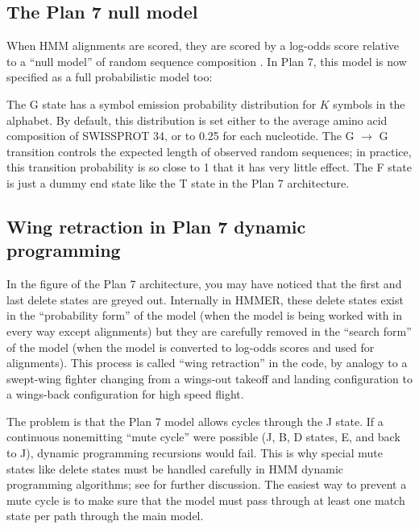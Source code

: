 \documentclass[11pt]{report}
\begin{document}
\subsection{The Plan 7 null model}

When HMM alignments are scored, they are scored by a log-odds score
relative to a ``null model'' of random sequence composition
\cite{Barrett97}. In Plan 7, this model is now specified as a full
probabilistic model too:

\begin{center}
\end{center}

The G state has a symbol emission probability distribution for $K$
symbols in the alphabet. By default, this distribution is set either
to the average amino acid composition of SWISSPROT 34, or to 0.25 for
each nucleotide. The G $\rightarrow$ G transition controls the
expected length of observed random sequences; in practice, this
transition probability is so close to 1 that it has very little
effect. The F state is just a dummy end state like the T state in the
Plan 7 architecture.

\subsection{Wing retraction in Plan 7 dynamic programming}

In the figure of the Plan 7 architecture, you may have noticed that
the first and last delete states are greyed out. Internally in HMMER,
these delete states exist in the ``probability form'' of the model
(when the model is being worked with in every way except alignments)
but they are carefully removed in the ``search form'' of the model
(when the model is converted to log-odds scores and used for
alignments). This process is called ``wing retraction'' in the code,
by analogy to a swept-wing fighter changing from a wings-out takeoff
and landing configuration to a wings-back configuration for high speed
flight.

The problem is that the Plan 7 model allows cycles through the J
state. If a continuous nonemitting ``mute cycle'' were possible (J, B,
D states, E, and back to J), dynamic programming recursions would
fail. This is why special mute states like delete states must be
handled carefully in HMM dynamic programming algorithms; see
\cite{Durbin98} for further discussion. The easiest way to
prevent a mute cycle is to make sure that the model must pass through
at least one match state per path through the main model.
\end{document}
